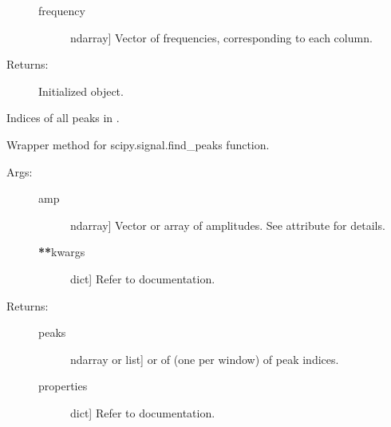 \documentclass[letterpaper,10pt,english,openany,oneside]{sphinxmanual}
\begin{document}
\begin{fulllineitems}
\begin{fulllineitems}
\begin{description}
\begin{description}
\item[{frequency}] \leavevmode{[}ndarray{]}
Vector of frequencies, corresponding to each column.

\end{description}

\item[{Returns:}] \leavevmode
Initialized  object.

\end{description}

\end{fulllineitems}


\begin{fulllineitems}
\label{\detokenize{index:hvsrpy.Hvsr.find_peaks}}
Indices of all peaks in .

Wrapper method for scipy.signal.find\_peaks function.
\begin{description}
\item[{Args:}] \leavevmode\begin{description}
\item[{amp}] \leavevmode{[}ndarray{]}
Vector or array of amplitudes. See  attribute for 
details.

\item[{{\color{red}\bfseries{}**}kwargs}] \leavevmode{[}dict{]}
Refer to
documentation.

\end{description}

\item[{Returns:}] \leavevmode\begin{description}
\item[{peaks}] \leavevmode{[}ndarray or list{]}
 or  of  (one per window) of
peak indices.

\item[{properties}] \leavevmode{[}dict{]}
Refer to
documentation.

\end{description}


\end{description}
\end{fulllineitems}
\end{fulllineitems}
\end{document}
